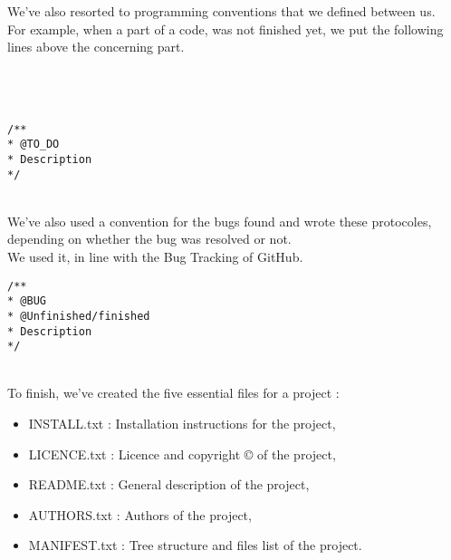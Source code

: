 We've also resorted to programming conventions that we defined between us.\\
For example, when a part of a code, was not finished yet, we put the following lines above the concerning part.\\\\\\\\

\begin{lstlisting}[frame=trBL, title=Programming convention for unfinished code]
/**
* @TO_DO
* Description
*/
\end{lstlisting}
~\\

We've also used a convention for the bugs found and wrote these protocoles, depending on whether the bug was resolved or not.\\
We used it, in line with the Bug Tracking of GitHub.\\

\begin{lstlisting}[frame=trBL, title=Programming convention for bugs]
/**
* @BUG
* @Unfinished/finished
* Description
*/
\end{lstlisting}
~\\

To finish, we've created the five essential files for a project :\\

\begin{itemize}
\item INSTALL.txt  : Installation instructions for the project,
\item LICENCE.txt  : Licence and copyright \copyright{} of the project,
\item README.txt   : General description of the project,
\item AUTHORS.txt  : Authors of the project,
\item MANIFEST.txt : Tree structure and files list of the project.
\end{itemize}
